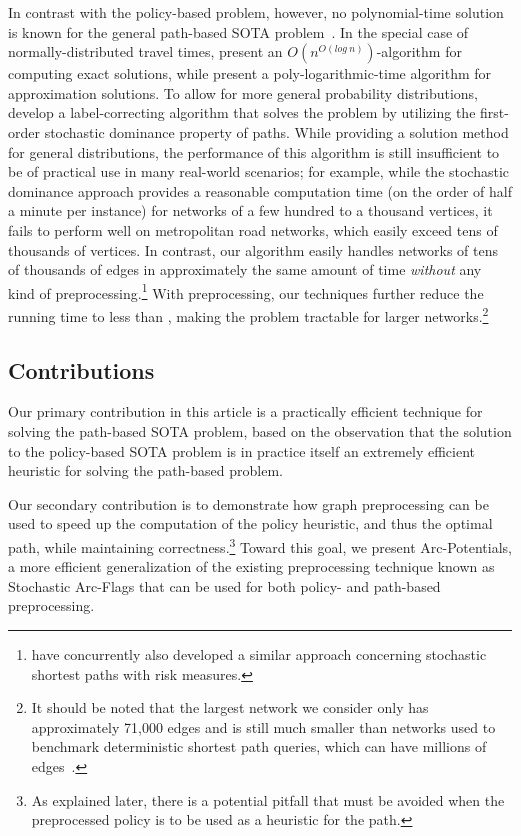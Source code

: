 \documentclass[oribibl]{llncs}
\begin{document}
		In contrast with the policy-based problem, however,
		no polynomial-time solution is known for the general path-based SOTA problem~\cite{nie2009shortest}.
		In the special case of normally-distributed travel times,
		\citet{nikolova2006stochastic} present an $O(n^{O(log~n)})$-algorithm for computing exact solutions,
		while \citet{lim2013practical} present a poly-logarithmic-time algorithm for approximation solutions.
		To allow for more general probability distributions, \citet*{nie2009shortest} develop a
		label-correcting algorithm that solves the problem by utilizing the first-order stochastic dominance
		property of paths.
		While providing a solution method for general distributions, the performance of this algorithm is
		still insufficient to be of practical use in many real-world scenarios;
		for example, while the stochastic dominance approach provides a reasonable computation time
		(on the order of half a minute per instance) for networks of a few hundred to a thousand vertices,
		it fails to perform well on metropolitan road networks, which easily exceed tens of thousands of vertices.
		In contrast, our algorithm easily handles networks of tens of thousands of edges
		in approximately the same amount of time \textit{without} any kind of preprocessing.\footnote
		{
			\citet{parmentier2014stochastic} have concurrently also developed a similar approach
			concerning stochastic shortest paths with risk measures.
		}
		With preprocessing, our techniques further reduce the running time to less than
		, making the problem tractable for larger networks.\footnote
		{
			It should be noted that the largest network we consider only has approximately 71,000 edges and
			is still much smaller than networks used to benchmark deterministic shortest path queries,
			which can have millions of edges~\cite{delling2009}.
		}

		\subsection{Contributions}
		Our primary contribution in this article is a practically efficient technique for solving the
		path-based SOTA problem, based on the observation that the solution to the policy-based SOTA problem
		is in practice itself an extremely efficient heuristic for solving the path-based problem.

		Our secondary contribution is to demonstrate how graph preprocessing can be used to speed up the
		computation of the policy heuristic, and thus the optimal path, while maintaining correctness.\footnote
		{
			As explained later, there is a potential pitfall that must be avoided when
			the preprocessed policy is to be used as a heuristic for the path.
		}
		Toward this goal, we present Arc-Potentials, a more efficient generalization of the existing
		preprocessing technique known as Stochastic Arc-Flags that can be used for both
		policy- and path-based preprocessing.
\end{document}
